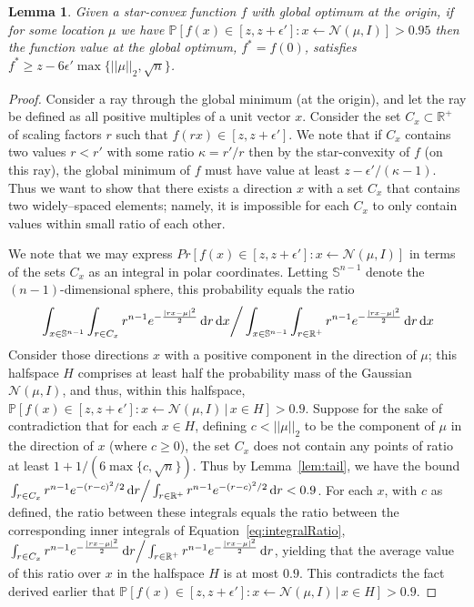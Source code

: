 \documentclass[11pt,letter]{article}
\renewcommand{\Pr}{\mathbb{P}}
\newcommand{\from}{\leftarrow}
\newcommand{\Normal}{\mathcal{N}}
\renewcommand{\d}{\mathrm{d}}
\newcommand{\ferr}{\epsilon}
\newcounter{nTheorems}
\numberwithin{nTheorems}{section}
\newtheorem{lemma}[nTheorems]{Lemma}
\begin{document}
\begin{lemma}
\label{lem:Victory}
Given a star-convex function $f$ with global optimum at the origin, if for some location $\mu$ we have $\Pr[f(x) \in [z, z+\ferr'] : x \from \Normal(\mu, I)] > 0.95$ then
the function value at the global optimum, $f^\ast=f(0)$, satisfies $f^\ast\geq z-6\epsilon'\max\{||\mu||_2,\sqrt{n}\}$.

\end{lemma}
\begin{proof}
  Consider a ray through the global minimum (at the origin), and let the ray be defined as all positive multiples of a unit vector $x$. Consider the set $C_x\subset\mathbb{R}^+$ of scaling factors $r$ such that $f(rx)\in[z,z+\ferr']$. We note that if $C_x$ contains two values $r<r'$ with some ratio $\kappa=r'/r$ then by the star-convexity of $f$ (on this ray), the global minimum of $f$ must have value at least $z-\ferr'/(\kappa-1)$. Thus we want to show that there exists a direction $x$ with a set $C_x$ that contains two widely--spaced elements; namely, it is impossible for each $C_x$ to only contain values within small ratio of each other.

  We note that we may express $Pr[f(x)\in[z,z+\ferr']:x\leftarrow\mathcal{N}(\mu,I)]$ in terms of the sets $C_x$ as an integral in polar coordinates. Letting $\mathbb{S}^{n-1}$ denote the $(n-1)$-dimensional sphere, this probability equals the ratio
  \begin{equation}\label{eq:integralRatio} \left.\int_{x\in \mathbb{S}^{n-1}} \int_{r\in C_x} r^{n-1}e^{-\frac{|rx-\mu|^2}{2}}\,\d r\,\d x\right/\int_{x\in \mathbb{S}^{n-1}} \int_{r\in \mathbb{R}^+} r^{n-1}e^{-\frac{|rx-\mu|^2}{2}}\,\d r\,\d x \end{equation}
  Consider those directions $x$ with a positive component in the direction of $\mu$; this halfspace $H$ comprises at least half the probability mass of the Gaussian $\mathcal{N}(\mu,I)$, and thus, within this halfspace, $\Pr[f(x) \in [z, z+\ferr'] : x \from \Normal(\mu, I) \,|\, x\in H] > 0.9$. Suppose for the sake of contradiction that for each $x\in H$, defining $c<||\mu||_2$  to be the component of $\mu$ in the direction of $x$ (where $c\geq 0$), the set $C_x$ does not contain any points of ratio at least $1+1/(6\max\{c,\sqrt{n}\})$. Thus by Lemma~\ref{lem:tail}, we have the bound $\left.\int_{r\in C_x} r^{n-1}e^{-(r-c)^2/2}\,\d r\right/\int_{r\in \mathbb{R}^+} r^{n-1}e^{-(r-c)^2/2}\,\d r< 0.9$. For each $x$, with $c$ as defined, the ratio between these integrals equals the ratio between the corresponding inner integrals of Equation~\ref{eq:integralRatio}, $ \left.\int_{r\in C_x} r^{n-1}e^{-\frac{|rx-\mu|^2}{2}}\,\d r\right/\int_{r\in \mathbb{R}^+} r^{n-1}e^{-\frac{|rx-\mu|^2}{2}}\,\d r$, yielding that the average value of this ratio over $x$ in the halfspace $H$ is at most $0.9$. This contradicts the fact derived earlier that $\Pr[f(x) \in [z, z+\ferr'] : x \from \Normal(\mu, I) \,|\, x\in H] > 0.9$.


\end{proof}
\end{document}
